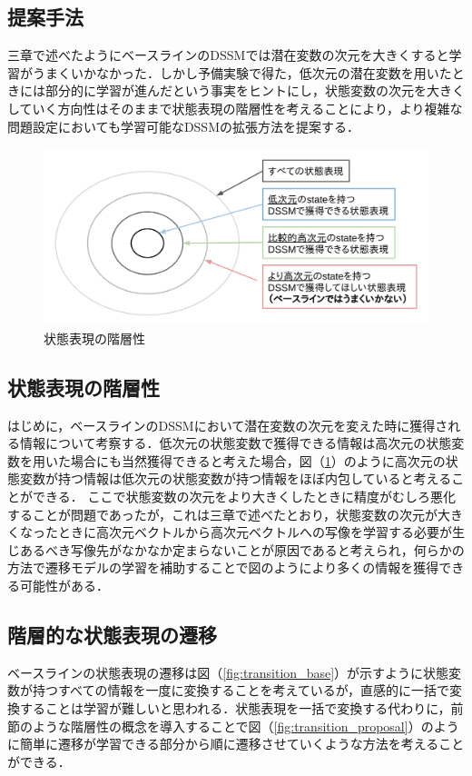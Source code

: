 \documentclass[10pt, twocolumn]{jarticle}
\begin{document}
\subsection{提案手法}
三章で述べたようにベースラインのDSSMでは潜在変数の次元を大きくすると学習がうまくいかなかった．しかし予備実験で得た，低次元の潜在変数を用いたときには部分的に学習が進んだという事実をヒントにし，状態変数の次元を大きくしていく方向性はそのままで状態表現の階層性を考えることにより，より複雑な問題設定においても学習可能なDSSMの拡張方法を提案する．

\begin{figure}[tp]
  \begin{center}
    \includegraphics[width=\linewidth]{./figures/hierarchical.png}
    \caption{状態表現の階層性}
    \label{fig:hierarchical}
  \end{center}
\end{figure}

\subsection{状態表現の階層性}
はじめに，ベースラインのDSSMにおいて潜在変数の次元を変えた時に獲得される情報について考察する．低次元の状態変数で獲得できる情報は高次元の状態変数を用いた場合にも当然獲得できると考えた場合，図（\ref{fig:hierarchical}）のように高次元の状態変数が持つ情報は低次元の状態変数が持つ情報をほぼ内包していると考えることができる．
ここで状態変数の次元をより大きくしたときに精度がむしろ悪化することが問題であったが，これは三章で述べたとおり，状態変数の次元が大きくなったときに高次元ベクトルから高次元ベクトルへの写像を学習する必要が生じあるべき写像先がなかなか定まらないことが原因であると考えられ，何らかの方法で遷移モデルの学習を補助することで図のようにより多くの情報を獲得できる可能性がある．

\subsection{階層的な状態表現の遷移}
ベースラインの状態表現の遷移は図（\ref{fig:transition_base}）が示すように状態変数が持つすべての情報を一度に変換することを考えているが，直感的に一括で変換することは学習が難しいと思われる．状態表現を一括で変換する代わりに，前節のような階層性の概念を導入することで図（\ref{fig:transition_proposal}）のように簡単に遷移が学習できる部分から順に遷移させていくような方法を考えることができる．
\end{document}
